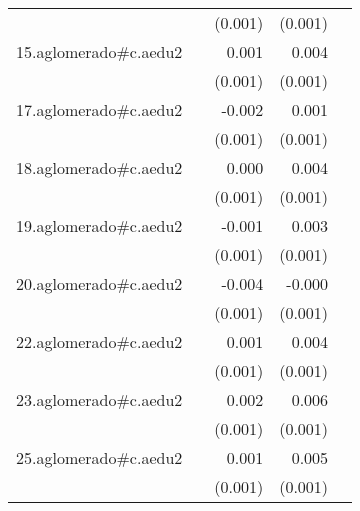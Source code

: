 {\begin{longtable}{l*{4}{D{.}{.}{-1}}}
            &                     &     (0.001)         &     (0.001)         &                     \\
\addlinespace
15.aglomerado#c.aedu2&                     &       0.001         &       0.004\sym{***}&                     \\
            &                     &     (0.001)         &     (0.001)         &                     \\
\addlinespace
17.aglomerado#c.aedu2&                     &      -0.002         &       0.001         &                     \\
            &                     &     (0.001)         &     (0.001)         &                     \\
\addlinespace
18.aglomerado#c.aedu2&                     &       0.000         &       0.004\sym{***}&                     \\
            &                     &     (0.001)         &     (0.001)         &                     \\
\addlinespace
19.aglomerado#c.aedu2&                     &      -0.001         &       0.003\sym{***}&                     \\
            &                     &     (0.001)         &     (0.001)         &                     \\
\addlinespace
20.aglomerado#c.aedu2&                     &      -0.004\sym{**} &      -0.000         &                     \\
            &                     &     (0.001)         &     (0.001)         &                     \\
\addlinespace
22.aglomerado#c.aedu2&                     &       0.001         &       0.004\sym{***}&                     \\
            &                     &     (0.001)         &     (0.001)         &                     \\
\addlinespace
23.aglomerado#c.aedu2&                     &       0.002         &       0.006\sym{***}&                     \\
            &                     &     (0.001)         &     (0.001)         &                     \\
\addlinespace
25.aglomerado#c.aedu2&                     &       0.001         &       0.005\sym{***}&                     \\
            &                     &     (0.001)         &     (0.001)         &                     \\

\end{longtable}}
